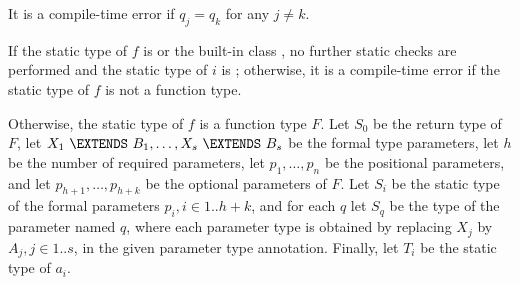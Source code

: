 \documentclass[makeidx]{article}
\begin{document}
\LMHash{}%
It is a compile-time error if $q_j = q_k$ for any $j \ne k$.

\LMHash{}%
If the static type of $f$ is \DYNAMIC{} or the built-in class \FUNCTION{},
no further static checks are performed and the static type of $i$ is \DYNAMIC{};
otherwise, it is a compile-time error if the static type of $f$ is not a function type.

\LMHash{}%
Otherwise, the static type of $f$ is a function type $F$.
Let $S_0$ be the return type of $F$,
let $X_1\ \EXTENDS\ B_1, \ldots, X_s\ \EXTENDS\ B_s$
be the formal type parameters,
let $h$ be the number of required parameters,
let $p_1, \ldots, p_n$ be the positional parameters,
and let $p_{h+1}, \ldots, p_{h+k}$ be the optional parameters of $F$.
Let $S_i$ be the static type of the formal parameters $p_i, i \in 1 .. h+k$,
and for each $q$ let $S_q$ be the type of the parameter named $q$,
where each parameter type is obtained by replacing $X_j$ by $A_j, j \in 1 .. s$,
in the given parameter type annotation.
Finally, let $T_i$ be the static type of $a_i$.

\end{document}
